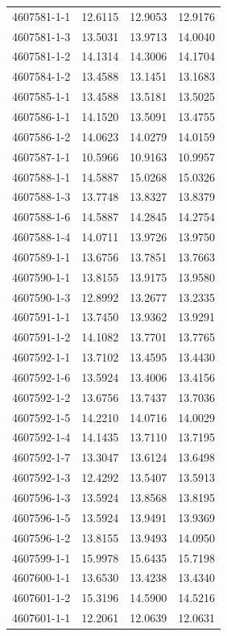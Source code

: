 \begin{longtable}{lrrr}
4607581-1-1 & 12.6115 & 12.9053 & 12.9176 \\
4607581-1-3 & 13.5031 & 13.9713 & 14.0040 \\
4607581-1-2 & 14.1314 & 14.3006 & 14.1704 \\
4607584-1-2 & 13.4588 & 13.1451 & 13.1683 \\
4607585-1-1 & 13.4588 & 13.5181 & 13.5025 \\
4607586-1-1 & 14.1520 & 13.5091 & 13.4755 \\
4607586-1-2 & 14.0623 & 14.0279 & 14.0159 \\
4607587-1-1 & 10.5966 & 10.9163 & 10.9957 \\
4607588-1-1 & 14.5887 & 15.0268 & 15.0326 \\
4607588-1-3 & 13.7748 & 13.8327 & 13.8379 \\
4607588-1-6 & 14.5887 & 14.2845 & 14.2754 \\
4607588-1-4 & 14.0711 & 13.9726 & 13.9750 \\
4607589-1-1 & 13.6756 & 13.7851 & 13.7663 \\
4607590-1-1 & 13.8155 & 13.9175 & 13.9580 \\
4607590-1-3 & 12.8992 & 13.2677 & 13.2335 \\
4607591-1-1 & 13.7450 & 13.9362 & 13.9291 \\
4607591-1-2 & 14.1082 & 13.7701 & 13.7765 \\
4607592-1-1 & 13.7102 & 13.4595 & 13.4430 \\
4607592-1-6 & 13.5924 & 13.4006 & 13.4156 \\
4607592-1-2 & 13.6756 & 13.7437 & 13.7036 \\
4607592-1-5 & 14.2210 & 14.0716 & 14.0029 \\
4607592-1-4 & 14.1435 & 13.7110 & 13.7195 \\
4607592-1-7 & 13.3047 & 13.6124 & 13.6498 \\
4607592-1-3 & 12.4292 & 13.5407 & 13.5913 \\
4607596-1-3 & 13.5924 & 13.8568 & 13.8195 \\
4607596-1-5 & 13.5924 & 13.9491 & 13.9369 \\
4607596-1-2 & 13.8155 & 13.9493 & 14.0950 \\
4607599-1-1 & 15.9978 & 15.6435 & 15.7198 \\
4607600-1-1 & 13.6530 & 13.4238 & 13.4340 \\
4607601-1-2 & 15.3196 & 14.5900 & 14.5216 \\
4607601-1-1 & 12.2061 & 12.0639 & 12.0631 \\

\end{longtable}
